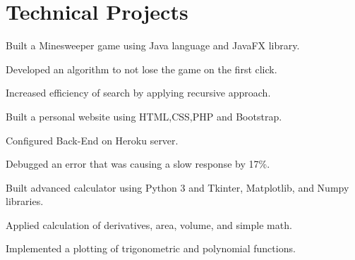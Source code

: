 \documentclass[]{deedy-resume-openfont}
\begin{document}
\hfill
\begin{minipage}[t]{0.59\textwidth} 



\section{Technical Projects}


\sectionsep
\begin{tightemize}
\item Built a Minesweeper game using Java language and JavaFX library.
\item Developed an algorithm  to not lose the game on the first click.
\item Increased efficiency of search by applying recursive approach.

\end{tightemize}

\sectionsep




\begin{tightemize}
\item Built a personal website using HTML,CSS,PHP and Bootstrap.
\item Configured Back-End on Heroku server.
\item Debugged an error that was causing a slow response by 17\%.
\end{tightemize}
\sectionsep

\begin{tightemize}
\item Built advanced calculator using Python 3 and Tkinter, Matplotlib, and Numpy libraries.
\item Applied calculation of derivatives, area, volume, and simple math.
\item Implemented a plotting of trigonometric and polynomial functions.

\end{tightemize}




\end{minipage}
\end{document}
